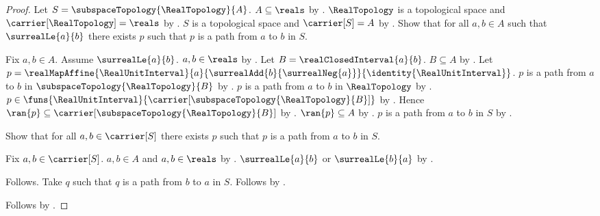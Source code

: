 \begin{proof}
    Let $S=\subspaceTopology{\RealTopology}{A}$.
    $A\subseteq\reals$ by .
    $\RealTopology$ is a topological space and $\carrier[\RealTopology]=\reals$ by
        .
    $S$ is a topological space and $\carrier[S]=A$ by
        .
    Show that for all $a,b\in A$ such that $\surrealLe{a}{b}$ there exists $p$
        such that $p$ is a path from $a$ to $b$ in $S$.
    \begin{subproof}
        Fix $a,b\in A$.
        Assume $\surrealLe{a}{b}$.
        $a,b\in\reals$ by .
        Let $B=\realClosedInterval{a}{b}$.
        $B\subseteq A$ by
            .
        Let $p=\realMapAffine{\RealUnitInterval}{a}{\surrealAdd{b}{\surrealNeg{a}}}
            {\identity{\RealUnitInterval}}$.
        $p$ is a path from $a$ to $b$ in $\subspaceTopology{\RealTopology}{B}$ by
            .
        $p$ is a path from $a$ to $b$ in $\RealTopology$ by
            .
        $p\in\funs{\RealUnitInterval}{\carrier[\subspaceTopology{\RealTopology}{B}]}$ by
            .
        Hence $\ran{p}\subseteq\carrier[\subspaceTopology{\RealTopology}{B}]$ by .
        $\ran{p}\subseteq A$ by .
        $p$ is a path from $a$ to $b$ in $S$ by .
    \end{subproof}
    Show that for all $a,b\in\carrier[S]$ there exists $p$ such that
        $p$ is a path from $a$ to $b$ in $S$.
    \begin{subproof}
        Fix $a,b\in\carrier[S]$.
        $a,b\in A$ and $a,b\in\reals$ by .
        $\surrealLe{a}{b}$ or $\surrealLe{b}{a}$ by .
        \begin{byCase}
                Follows.
                Take $q$ such that $q$ is a path from $b$ to $a$ in $S$.
                Follows by .
        \end{byCase}
    \end{subproof}
    Follows by .
\end{proof}

